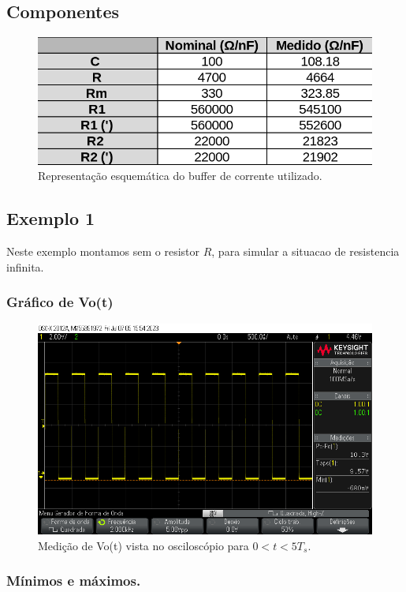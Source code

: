 \subsection{Componentes}

\begin{figure}[h]
    \centering
    \includegraphics[width=0.7\columnwidth]{images/componentes_reais.png}
    \caption{Representação esquemática do buffer de corrente utilizado.}
\end{figure}

\subsection{Exemplo 1}

Neste exemplo montamos sem o resistor $R$, para simular a situacao de resistencia infinita.

\subsubsection{Gráfico de Vo(t)}

\begin{figure}[H]
    \label{fig:ex1}
    \centering
    \includegraphics[width=0.7\columnwidth]{images/exemplo1.png}
    \caption{Medição de Vo(t) vista no osciloscópio para $0 < t < 5 T_s$.}
\end{figure}

\subsubsection{Mínimos e máximos.}

